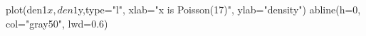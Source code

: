 \begin{Schunk}
\begin{Sinput}
 plot(den1$x,den1$y,type="l", xlab="x is Poisson(17)", ylab="density")
 abline(h=0, col="gray50", lwd=0.6)
\end{Sinput}
\end{Schunk}
